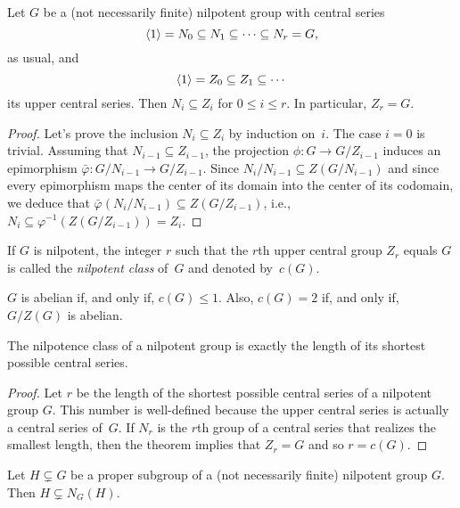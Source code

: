 \begin{thm}
    Let\/ $G$ be a (not necessarily finite) nilpotent group with central series
    $$
        \langle1\rangle = N_0 \subseteq N_1 \subseteq \cdots \subseteq N_r = G,
    $$
    as usual, and
    $$
        \langle1\rangle = Z_0 \subseteq Z_1 \subseteq \cdots
    $$
    its upper central series. Then $N_i \subseteq Z_i$ for $0\le i\le r$. In particular, $Z_r = G$.
\end{thm}

\begin{proof} Let's prove the inclusion $N_i\subseteq Z_i$ by induction on~$i$. The case $i=0$ is trivial. Assuming that $N_{i-1}\subseteq Z_{i-1}$, the projection $\phi\colon G\to G/Z_{i-1}$ induces an epimorphism $\bar\varphi\colon G/N_{i-1}\to G/Z_{i-1}$. Since $N_i/N_{i-1}\subseteq Z(G/N_{i-1})$ and since every epimorphism maps the center of its domain into the center of its codomain, we deduce that $\bar\varphi(N_i/N_{i-1})\subseteq Z(G/Z_{i-1})$, i.e., $N_i\subseteq\varphi^{-1}(Z(G/Z_{i-1}))=Z_i$.  \end{proof}

\begin{defn}
    If\/ $G$ is nilpotent, the integer $r$ such that the $r$th upper central group $Z_r$ equals $G$ is called the \textsl{nilpotent class} of\/~$G$ and denoted by~$c(G)$.
\end{defn}

\begin{rem}
    $G$ is abelian if, and only if, $c(G)\le1$. Also, $c(G)=2$ if, and only if, $G/Z(G)$ is abelian.
\end{rem}

\begin{cor}
    The nilpotence class of a nilpotent group is exactly the length of its shortest possible central series.
\end{cor}

\begin{proof} Let $r$ be the length of the shortest possible central series of a nilpotent group $G$. This number is well-defined because the upper central series is actually a central series of~$G$. If $N_r$ is the $r$th group of a central series that realizes the smallest length, then the theorem implies that $Z_r=G$ and so $r=c(G)$.  \end{proof}

\begin{thm}\label{normalizers-grow}
    Let\/ $H\varsubsetneq G$ be a proper subgroup of a (not necessarily finite) nilpotent group\/ $G$. Then\/ $H\varsubsetneq N_G(H)$.
\end{thm}

